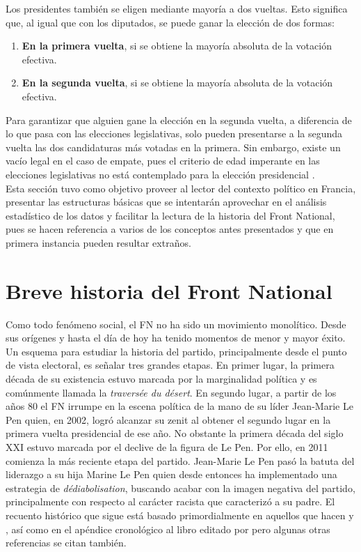 Los presidentes también se eligen mediante mayoría a dos vueltas. Esto significa que, al igual que con los diputados, se puede ganar la elección de dos formas: 

\begin{enumerate}
\item \textbf{En la primera vuelta}, si se obtiene la mayoría absoluta de la votación efectiva.  
\item \textbf{En la segunda vuelta}, si se obtiene la mayoría absoluta de la votación efectiva. 
\end{enumerate}

Para garantizar que alguien gane la elección en la segunda vuelta, a diferencia de lo que pasa con las elecciones legislativas, solo pueden presentarse a la segunda vuelta las dos candidaturas más votadas en la primera. Sin embargo, existe un vacío legal en el caso de empate, pues el criterio de edad imperante en las elecciones legislativas no está contemplado para la elección presidencial \parencite{Parisien16}.\\

Esta sección tuvo como objetivo proveer al lector del contexto político en Francia, presentar las estructuras básicas que se intentarán aprovechar en el análisis estadístico de los datos y facilitar la lectura de la historia del Front National, pues se hacen referencia a varios de los conceptos antes presentados y que en primera instancia pueden resultar extraños. 

\section{Breve historia del Front National}

Como todo fenómeno social, el FN no ha sido un movimiento monolítico. Desde sus orígenes y hasta el día de hoy ha tenido momentos de menor y mayor éxito. Un esquema para estudiar la historia del partido, principalmente desde el punto de vista electoral, es señalar tres grandes etapas. En primer lugar, la primera década de su existencia estuvo marcada por la marginalidad política y es comúnmente llamada la \textit{traversée du désert}. En segundo lugar, a partir de los años 80 el FN irrumpe en la escena política de la mano de su líder Jean-Marie Le Pen quien, en 2002, logró alcanzar su zenit al obtener el segundo lugar en la primera vuelta presidencial de ese año. No obstante la primera década del siglo XXI estuvo marcada por el declive de la figura de Le Pen. Por ello, en 2011 comienza la más reciente etapa del partido. Jean-Marie Le Pen pasó la batuta del liderazgo a su hija Marine Le Pen quien desde entonces ha implementado una estrategia de \textit{dédiabolisation}, buscando acabar con la imagen negativa del partido, principalmente con respecto al carácter racista que caracterizó a su padre. El recuento histórico que sigue está basado primordialmente en aquellos que hacen \textcite{Hainsworth16b} y \textcite{Stockemer17}, así como en el apéndice cronológico al libro editado por \textcite{CreponEtAl15} pero algunas otras referencias se citan también.\\

